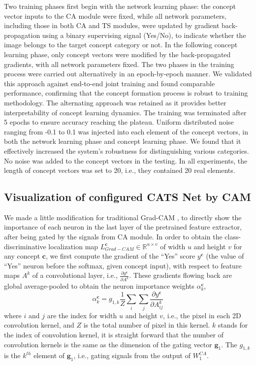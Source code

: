 \documentclass[pdflatex,sn-mathphys-num,lineno]{sn-jnl}%
\begin{document}
\begin{CJK}{UTF8}{gbsn}
Two training phases first begin with the network learning phase: the concept vector inputs to the CA module were fixed, while all network parameters, including those in both CA and TS modules, were updated by gradient back-propagation using a binary supervising signal (Yes/No), to indicate whether the image belongs to the target concept category or not. In the following concept learning phase, only concept vectors were modified by the back-propagated gradients, with all network parameters fixed. The two phases in the training process were carried out alternatively in an epoch-by-epoch manner. We validated this approach against end-to-end joint training and found comparable performance, confirming that the concept formation process is robust to training methodology. The alternating approach was retained as it provides better interpretability of concept learning dynamics. The training was terminated after 5 epochs to ensure accuracy reaching the plateau. Uniform distributed noise ranging from -0.1 to 0.1 was injected into each element of the concept vectors, in both the network learning phase and concept learning phase. We found that it effectively increased the system’s robustness for distinguishing various categories. No noise was added to the concept vectors in the testing. In all experiments, the length of concept vectors was set to 20, i.e., they contained 20 real elements. %

\subsection{Visualization of configured CATS Net by CAM}
We made a little modification for traditional Grad-CAM \cite{selvaraju_grad-cam_2017}, to directly show the importance of each neuron in the last layer of the pretrained feature extractor, after being gated by the signals from CA module. In order to obtain the class-discriminative localization map $L_{Grad-CAM}^{\mathbf{c}} \in \mathbb{R}^{u \times v}$ of width $u$ and height $v$ for any concept $\mathbf{c}$, we first compute the gradient of the “Yes” score $y^\mathbf{c}$ (the value of “Yes” neuron before the softmax, given concept input), with respect to feature maps $A^k$ of a convolutional layer, i.e., $\frac{\partial y^\mathbf{c}}{\partial A^k}$. These gradients flowing back are global average-pooled to obtain the neuron importance weights $\alpha_k^\mathbf{c}$,
$$\alpha_k^\mathbf{c} = g_{1, k} \frac{1}{Z} \sum_i \sum_j \frac{\partial y^\mathbf{c}}{\partial A^k_{ij}}$$
where $i$ and $j$ are the index for width $u$ and height $v$, i.e., the pixel in each 2D convolution kernel, and $Z$ is the total number of pixel in this kernel. $k$ stands for the index of convolution kernel, it is straight forward that the number of convolution kernels is the same as the dimension of the gating vector $\mathbf{g}_1$. The $g_{1, k}$ is the $k^{th}$ element of $\mathbf{g}_1$, i.e., gating signals from the output of $W_1^{CA}$. 


\end{CJK}
\end{document}
